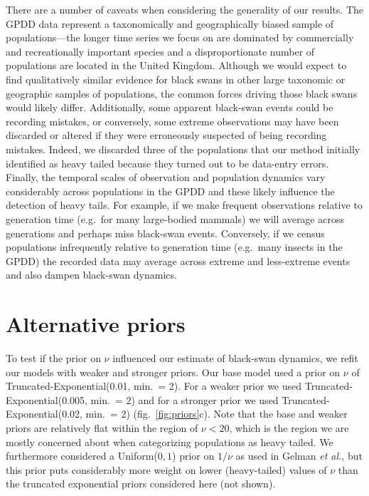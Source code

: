 \documentclass[12pt]{article}
\begin{document}
There are a number of caveats when considering the generality of our results. The GPDD data represent a taxonomically and geographically biased sample of populations---the longer time series we focus on are dominated by commercially and recreationally important species and a disproportionate number of populations are located in the United Kingdom. Although we would expect to find qualitatively similar evidence for black swans in other large taxonomic or geographic samples of populations, the common forces driving those black swans would likely differ. Additionally, some apparent black-swan events could be recording mistakes, or conversely, some extreme observations may have been discarded or altered if they were erroneously suspected of being recording mistakes. Indeed, we discarded three of the populations that our method initially identified as heavy tailed because they turned out to be data-entry errors. Finally, the temporal scales of observation and population dynamics vary considerably across populations in the GPDD and these likely influence the detection of heavy tails. For example, if we make frequent observations relative to generation time (e.g.~for many large-bodied mammals) we will average across generations and perhaps miss black-swan events. Conversely, if we census populations infrequently relative to generation time (e.g.~many insects in the GPDD) the recorded data may average across extreme and less-extreme events and also dampen black-swan dynamics.

\section{Alternative priors} To test if the prior on \(\nu\) influenced our estimate of black-swan dynamics, we refit our models with weaker and stronger priors. Our base model used a prior on \(\nu\) of Truncated-Exponential(0.01, min.\ = 2). For a weaker prior we used Truncated-Exponential(0.005, min.\ = 2) and for a stronger prior we used Truncated-Exponential(0.02, min.\ = 2) (fig.~\ref{fig:priors}c). Note that the base and weaker priors are relatively flat within the region of \(\nu < 20\), which is the region we are mostly concerned about when categorizing populations as heavy tailed. We furthermore considered a Uniform(\(0, 1\)) prior on \(1/\nu\) as used in Gelman \emph{et al.}\cite{gelman2014}, but this prior puts considerably more weight on lower (heavy-tailed) values of \(\nu\) than the truncated exponential priors considered here (not shown).
\end{document}
